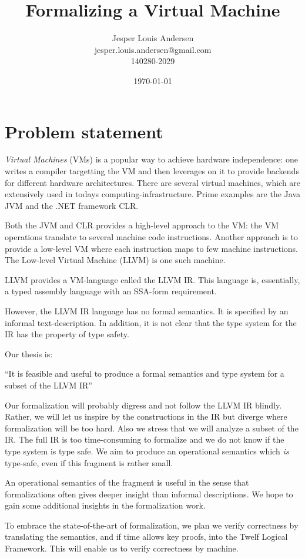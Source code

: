 \documentclass[a4paper, oneside, 10pt, final]{memoir}
\author{Jesper Louis
  Andersen\\jesper.louis.andersen@gmail.com\\140280-2029}
\title{Formalizing a Virtual Machine}
\date{\today}
\begin{document}
\maketitle{}
\chapter*{Problem statement}

\emph{Virtual Machines} (VMs) is a popular way to achieve hardware
independence: one writes a compiler targetting the VM and then
leverages on it to provide backends for different hardware
architectures. There are several virtual machines, which are
extensively used in todays computing-infrastructure. Prime examples
are the Java JVM and the .NET framework CLR.

Both the JVM and CLR provides a high-level approach to the VM: the VM
operations translate to several machine code instructions. Another
approach is to provide a low-level VM where each instruction maps to
few machine instructions. The Low-level Virtual Machine (LLVM) is one
such machine.

LLVM provides a VM-language called the LLVM IR. This language is,
essentially, a typed assembly language with an
SSA-form\cite{appel:1998:modern} requirement.

However, the LLVM IR language has no formal semantics. It is specified by an
informal text-description. In addition, it is not clear that the type
system for the IR has the property of type safety\cite{pierce:2002:types}.

Our thesis is:
\begin{center}
  ``It is feasible and useful to produce a formal semantics and type
  system for a subset of the LLVM IR''
\end{center}
Our formalization will probably digress and not follow the LLVM IR
blindly. Rather, we will let us inspire by the constructions in the IR
but diverge where formalization will be too hard. Also we stress that
we will analyze a subset of the IR. The full IR is too time-consuming
to formalize and we do not know if the type system is type safe. We
aim to produce an operational semantics which \emph{is} type-safe,
even if this fragment is rather small.

An operational semantics of the fragment is useful in the sense that
formalizations often gives deeper insight than informal
descriptions. We hope to gain some additional insights in the
formalization work.

To embrace the state-of-the-art of formalization, we plan we verify
correctness by translating the semantics, and if time allows key
proofs, into the Twelf Logical Framework. This will enable us to
verify correctness by machine.
\end{document}
